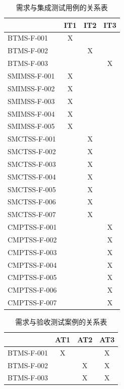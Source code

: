 \begin{enumerate}
						\begin{table}[!htbp]
					\centering
					\caption{需求与集成测试用例的关系表}
					\label{table11}
					\begin{tabular}{|l|c|c|c|}
					\hline
					 & \multicolumn{1}{l|}{IT1} & \multicolumn{1}{l|}{IT2} & \multicolumn{1}{l|}{IT3} \\ \hline
					BTMS-F-001 & X &  &  \\ \hline
					BTMS-F-002 &  & X &  \\ \hline
					BTMS-F-003 &  &  & X \\ \hline
					SMIMSS-F-001 & X &  &  \\ \hline
					SMIMSS-F-002 & X &  &  \\ \hline
					SMIMSS-F-003 & X &  &  \\ \hline
					SMIMSS-F-004 & X &  &  \\ \hline
					SMIMSS-F-005 & X &  &  \\ \hline
					SMCTSS-F-001 &  & X &  \\ \hline
					SMCTSS-F-002 &  & X &  \\ \hline
					SMCTSS-F-003 &  & X &  \\ \hline
					SMCTSS-F-004 &  & X &  \\ \hline
					SMCTSS-F-005 &  & X &  \\ \hline
					SMCTSS-F-006 &  & X &  \\ \hline
					SMCTSS-F-007 &  & X &  \\ \hline
					CMPTSS-F-001 &  &  & X \\ \hline
					CMPTSS-F-002 &  &  & X \\ \hline
					CMPTSS-F-003 & \multicolumn{1}{l|}{} & \multicolumn{1}{l|}{} & X \\ \hline
					CMPTSS-F-004 & \multicolumn{1}{l|}{} & \multicolumn{1}{l|}{} & X \\ \hline
					CMPTSS-F-005 & \multicolumn{1}{l|}{} & \multicolumn{1}{l|}{} & X \\ \hline
					CMPTSS-F-006 & \multicolumn{1}{l|}{} & \multicolumn{1}{l|}{} & X \\ \hline
					CMPTSS-F-007 & \multicolumn{1}{l|}{} & \multicolumn{1}{l|}{} & X \\ \hline
					\end{tabular}
					\end{table}


					\begin{table}[!htbp]
					\centering
					\caption{需求与验收测试案例的关系表}
					\label{table12}
					\begin{tabular}{|l|c|c|c|}
					\hline
					 & \multicolumn{1}{l|}{AT1} & \multicolumn{1}{l|}{AT2} & \multicolumn{1}{l|}{AT3} \\ \hline
					BTMS-F-001 & X &  & X \\ \hline
					BTMS-F-002 &  & X & X \\ \hline
					BTMS-F-003 &  & X & X \\ \hline
					\end{tabular}
					\end{table}



\end{enumerate}
